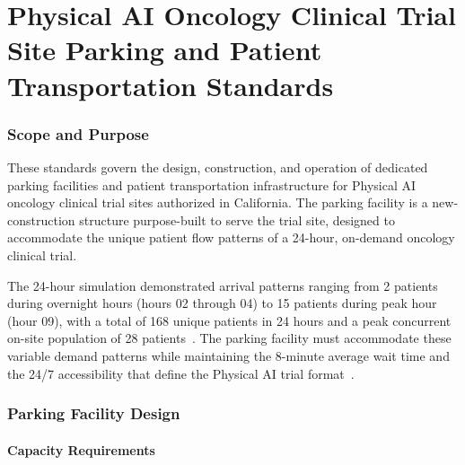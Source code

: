 

\part{Physical AI Oncology Clinical Trial Site Parking and Patient Transportation Standards}
\setcounter{section}{0}

\section{Scope and Purpose}

These standards govern the design, construction, and operation of dedicated
parking facilities and patient transportation infrastructure for Physical AI
oncology clinical trial sites authorized in California. The parking facility
is a new-construction structure purpose-built to serve the trial site, designed
to accommodate the unique patient flow patterns of a 24-hour, on-demand
oncology clinical trial.

The 24-hour simulation demonstrated arrival patterns ranging from 2 patients
during overnight hours (hours 02 through 04) to 15 patients during peak hour
(hour 09), with a total of 168 unique patients in 24 hours and a peak
concurrent on-site population of 28 patients~\cite{newtrial2026}. The parking
facility must accommodate these variable demand patterns while maintaining the
8-minute average wait time and the 24/7 accessibility that define the Physical
AI trial format~\cite{formatcomparison2026}.

\section{Parking Facility Design}

\subsection{Capacity Requirements}

